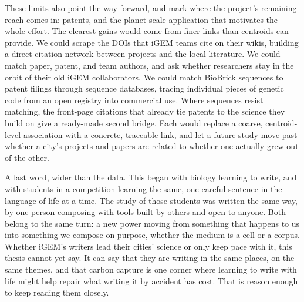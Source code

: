 \documentclass[12pt,a4paper]{article}
\begin{document}
	These limits also point the way forward, and mark where the project's remaining
	reach comes in: patents, and the planet-scale application that motivates the whole
	effort. The clearest gains would come from finer links than centroids can provide.
	We could scrape the DOIs that iGEM teams cite on their wikis, building a direct
	citation network between projects and the local literature. We could match paper,
	patent, and team authors, and ask whether researchers stay in the orbit of their
	old iGEM collaborators. We could match BioBrick sequences to patent filings through
	sequence databases, tracing individual pieces of genetic code from an open registry
	into commercial use. Where sequences resist matching, the front-page citations that
	already tie patents to the science they build on
	\citep{narinIncreasingLinkage1997, marxFuegiRelianceScience2020} give a ready-made
	second bridge. Each would replace a coarse, centroid-level association with a
	concrete, traceable link, and let a future study move past whether a city's projects
	and papers are related to whether one actually grew out of the other.
	
	A last word, wider than the data. This began with biology learning to write, and
	with students in a competition learning the same, one careful sentence in the
	language of life at a time. The study of those students was written the same way, by
	one person composing with tools built by others and open to anyone. Both belong to
	the same turn: a new power moving from something that happens to us into something we
	compose on purpose, whether the medium is a cell or a corpus. Whether iGEM's writers
	lead their cities' science or only keep pace with it, this thesis cannot yet say. It
	can say that they are writing in the same places, on the same themes, and that carbon
	capture is one corner where learning to write with life might help repair what
	writing it by accident has cost. That is reason enough to keep reading them closely.
	
	
	
	
\end{document}
